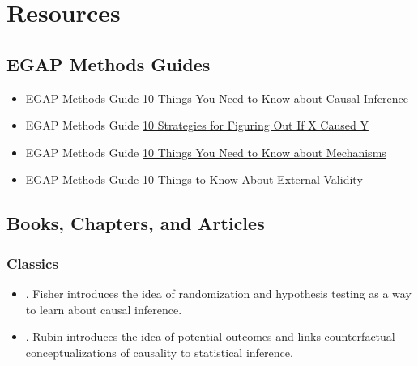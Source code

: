 \documentclass[12pt,]{book}
\begin{document}
\hypertarget{resources-1}{%
\section{Resources}\label{resources-1}}

\hypertarget{egap-methods-guides-1}{%
\subsection{EGAP Methods Guides}\label{egap-methods-guides-1}}

\begin{itemize}
\item
  EGAP Methods Guide \href{https://egap.org/resource/10-things-to-know-about-causal-inference/}{10 Things You Need to Know about Causal Inference}
\item
  EGAP Methods Guide \href{https://egap.org/resource/10-strategies-for-figuring-out-if-x-caused-y/}{10 Strategies for Figuring Out If X Caused Y}
\item
  EGAP Methods Guide \href{https://egap.org/resource/10-things-mechanisms/}{10 Things You Need to Know about Mechanisms}
\item
  EGAP Methods Guide \href{https://egap.org/resource/10-things-to-know-about-external-validity/}{10 Things to Know About External Validity}
\end{itemize}

\hypertarget{causalinference-cites}{%
\subsection{Books, Chapters, and Articles}\label{causalinference-cites}}

\hypertarget{causalinference-classics}{%
\subsubsection{Classics}\label{causalinference-classics}}

\begin{itemize}
\item
  \autocite{fisher_design_1935}. Fisher introduces the idea of randomization and hypothesis testing as a way to learn about causal inference.
\item
  \autocite{rubin:1974}. Rubin introduces the idea of potential outcomes and links counterfactual conceptualizations of causality to statistical inference.
\end{itemize}
\end{document}
